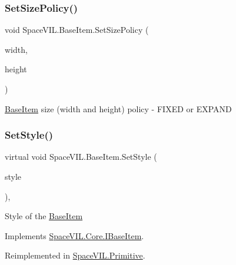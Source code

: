 \subsubsection{\texorpdfstring{Set\+Size\+Policy()}{SetSizePolicy()}}
{\footnotesize\ttfamily void Space\+V\+I\+L.\+Base\+Item.\+Set\+Size\+Policy (\begin{DoxyParamCaption}\item[{Size\+Policy}]{width,  }\item[{Size\+Policy}]{height }\end{DoxyParamCaption})\hspace{0.3cm}{\ttfamily [inline]}}



\mbox{\hyperlink{class_space_v_i_l_1_1_base_item}{Base\+Item}} size (width and height) policy -\/ F\+I\+X\+ED or E\+X\+P\+A\+ND 

\mbox{\label{class_space_v_i_l_1_1_base_item_a74dec9854f0a7553ad3b50f140bfe07d}} 
\subsubsection{\texorpdfstring{Set\+Style()}{SetStyle()}}
{\footnotesize\ttfamily virtual void Space\+V\+I\+L.\+Base\+Item.\+Set\+Style (\begin{DoxyParamCaption}\item[{\mbox{\hyperlink{class_space_v_i_l_1_1_decorations_1_1_style}{Style}}}]{style }\end{DoxyParamCaption})\hspace{0.3cm}{\ttfamily [inline]}, {\ttfamily [virtual]}}



Style of the \mbox{\hyperlink{class_space_v_i_l_1_1_base_item}{Base\+Item}} 



Implements \mbox{\hyperlink{interface_space_v_i_l_1_1_core_1_1_i_base_item}{Space\+V\+I\+L.\+Core.\+I\+Base\+Item}}.



Reimplemented in \mbox{\hyperlink{class_space_v_i_l_1_1_primitive_ad2a9fbb75eddf7f36af72385a5453fb2}{Space\+V\+I\+L.\+Primitive}}.

\mbox{\label{class_space_v_i_l_1_1_base_item_abce4d28de70cae71fde1612342e519a4}} 
